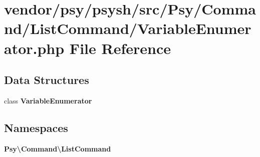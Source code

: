 \section{vendor/psy/psysh/src/\+Psy/\+Command/\+List\+Command/\+Variable\+Enumerator.php File Reference}
\label{_variable_enumerator_8php}
\subsection*{Data Structures}
\begin{DoxyCompactItemize}
\item 
class {\bf Variable\+Enumerator}
\end{DoxyCompactItemize}
\subsection*{Namespaces}
\begin{DoxyCompactItemize}
\item 
 {\bf Psy\textbackslash{}\+Command\textbackslash{}\+List\+Command}
\end{DoxyCompactItemize}
